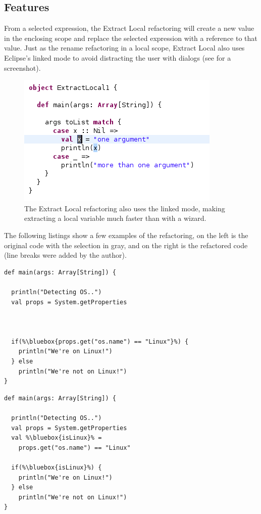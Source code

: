 \documentclass[10pt,a4paper,oneside]{scrreprt}
\begin{document}
\subsection{Features}

From a selected expression, the Extract Local refactoring will create a new value in the enclosing scope and replace the selected expression with a reference to that value. Just as the rename refactoring in a local scope, Extract Local also uses Eclipse's linked mode to avoid distracting the user with dialogs (see  for a screenshot).

\begin{figure}
  \centering
  \includegraphics[width=0.55\linewidth]{extract_local_screenshot_1.png}
  \caption{The Extract Local refactoring also uses the linked mode, making extracting a local variable much faster than with a wizard.}
  \label{figure:extract-local-screenshot-1}
\end{figure}


The following listings show a few examples of the refactoring, on the left is the original code with the selection in gray, and on the right is the refactored code (line breaks were added by the author).

\begin{multicols}{2}
\begin{lstlisting}
def main(args: Array[String]) {

  println("Detecting OS..")
  val props = System.getProperties
  


  if(%\bluebox{props.get("os.name") == "Linux"}%) {
    println("We're on Linux!")
  } else
    println("We're not on Linux!")
}
\end{lstlisting}
\begin{lstlisting}
def main(args: Array[String]) {

  println("Detecting OS..")
  val props = System.getProperties
  val %\bluebox{isLinux}% = 
    props.get("os.name") == "Linux"
  
  if(%\bluebox{isLinux}%) {
    println("We're on Linux!")
  } else
    println("We're not on Linux!")
}
\end{lstlisting}
\end{multicols}
\end{document}
